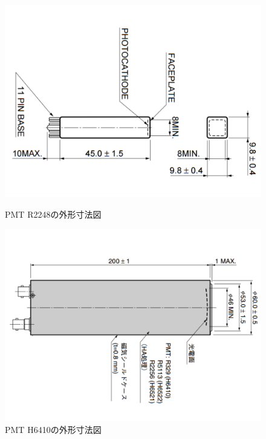 \begin{figure}[htbp]
\begin{minipage}{0.5\hsize}
\centering
\includegraphics[keepaspectratio,angle=90,scale=0.4]{fig/ybm/pmtmini.pdf}
	\caption{PMT R2248の外形寸法図\cite{pmtR2248shape}}
\label{fig:pmtmini}
\end{minipage}
\begin{minipage}{0.5\hsize}
\centering
\includegraphics[keepaspectratio,angle=90,scale=0.4]{fig/ybm/pmtbig.pdf}
	\caption{PMT H6410の外形寸法図\cite{pmtH6410shape}}
\label{fig:pmtbig}
\end{minipage}
\end{figure}

